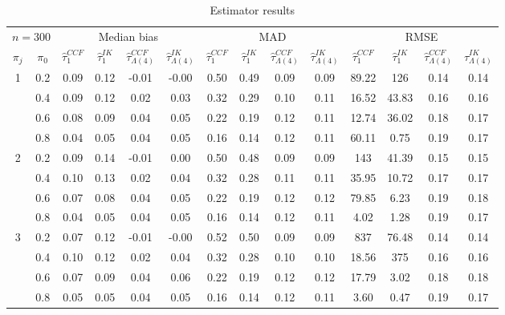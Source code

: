 \begin{table}[h!]
\centering
\addtolength{\tabcolsep}{-2pt} 
\small
\begin{threeparttable}
\caption{Estimator results}
\vspace{-0.5em}
\begin{tabular*}{\textwidth}{@{\extracolsep{\fill}} c c c c c c c c c c c c c c}
\toprule
\multicolumn{2}{c}{$n=300$} & \multicolumn{4}{c}{Median bias} & \multicolumn{4}{c}{MAD} & \multicolumn{4}{c}{RMSE} \\
\cmidrule(r){1-2} \cmidrule(r){3-6} \cmidrule(l){7-10} \cmidrule(l){11-14}
$\pi_j$ & $\pi_0$ & $\hat{\tau}^{CCF}_{1}$ & $\hat{\tau}^{IK}_{1}$ & $\hat{\tau}^{CCF}_{\Lambda(4)}$ & $\hat{\tau}^{IK}_{\Lambda(4)}$ &
$\hat{\tau}^{CCF}_{1}$ & $\hat{\tau}^{IK}_{1}$ & $\hat{\tau}^{CCF}_{\Lambda(4)}$ & $\hat{\tau}^{IK}_{\Lambda(4)}$ &
$\hat{\tau}^{CCF}_{1}$ & $\hat{\tau}^{IK}_{1}$ & $\hat{\tau}^{CCF}_{\Lambda(4)}$ & $\hat{\tau}^{IK}_{\Lambda(4)}$ \\
\midrule
\multirow{4}{*}{1} & 0.2 & 0.09 & 0.12 & -0.01 & -0.00 & 0.50 & 0.49 & 0.09 & 0.09 & 89.22 & 126 & 0.14 & 0.14 \\
& 0.4 & 0.09 & 0.12 & 0.02 & 0.03 & 0.32 & 0.29 & 0.10 & 0.11 & 16.52 & 43.83 & 0.16 & 0.16 \\
& 0.6 & 0.08 & 0.09 & 0.04 & 0.05 & 0.22 & 0.19 & 0.12 & 0.11 & 12.74 & 36.02 & 0.18 & 0.17 \\
& 0.8 & 0.04 & 0.05 & 0.04 & 0.05 & 0.16 & 0.14 & 0.12 & 0.11 & 60.11 & 0.75 & 0.19 & 0.17 \\
\hline
\multirow{4}{*}{2} & 0.2 & 0.09 & 0.14 & -0.01 & 0.00 & 0.50 & 0.48 & 0.09 & 0.09 & 143 & 41.39 & 0.15 & 0.15 \\
& 0.4 & 0.10 & 0.13 & 0.02 & 0.04 & 0.32 & 0.28 & 0.11 & 0.11 & 35.95 & 10.72 & 0.17 & 0.17 \\
& 0.6 & 0.07 & 0.08 & 0.04 & 0.05 & 0.22 & 0.19 & 0.12 & 0.12 & 79.85 & 6.23 & 0.19 & 0.18 \\
& 0.8 & 0.04 & 0.05 & 0.04 & 0.05 & 0.16 & 0.14 & 0.12 & 0.11 & 4.02 & 1.28 & 0.19 & 0.17 \\
\hline
\multirow{4}{*}{3} & 0.2 & 0.07 & 0.12 & -0.01 & -0.00 & 0.52 & 0.50 & 0.09 & 0.09 & 837 & 76.48 & 0.14 & 0.14 \\
& 0.4 & 0.10 & 0.12 & 0.02 & 0.04 & 0.32 & 0.28 & 0.10 & 0.10 & 18.56 & 375 & 0.16 & 0.16 \\
& 0.6 & 0.07 & 0.09 & 0.04 & 0.06 & 0.22 & 0.19 & 0.12 & 0.12 & 17.79 & 3.02 & 0.18 & 0.18 \\
& 0.8 & 0.05 & 0.05 & 0.04 & 0.05 & 0.16 & 0.14 & 0.12 & 0.11 & 3.60 & 0.47 & 0.19 & 0.17 \\

\end{tabular*}
\end{threeparttable}
\end{table}
